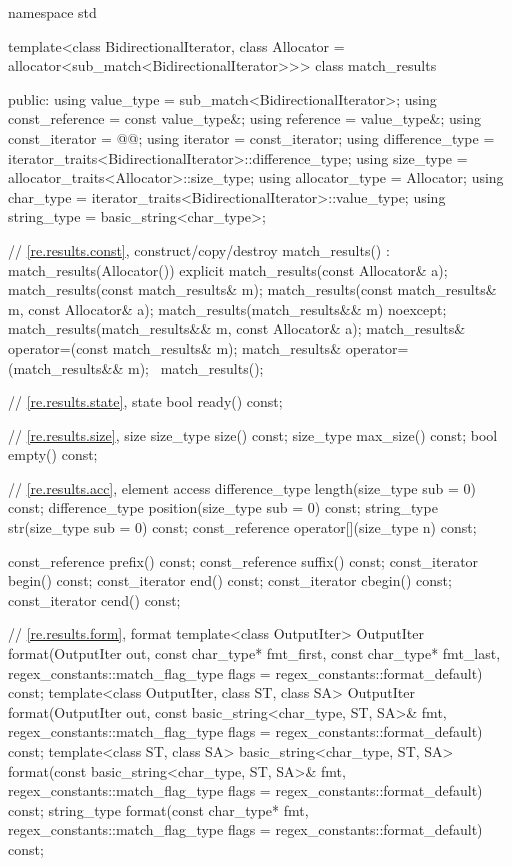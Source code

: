\begin{codeblock}
namespace std {
  template<class BidirectionalIterator,
           class Allocator = allocator<sub_match<BidirectionalIterator>>>
  class match_results {
  public:
    using value_type      = sub_match<BidirectionalIterator>;
    using const_reference = const value_type&;
    using reference       = value_type&;
    using const_iterator  = @@;
    using iterator        = const_iterator;
    using difference_type = iterator_traits<BidirectionalIterator>::difference_type;
    using size_type       = allocator_traits<Allocator>::size_type;
    using allocator_type  = Allocator;
    using char_type       = iterator_traits<BidirectionalIterator>::value_type;
    using string_type     = basic_string<char_type>;

    // \ref{re.results.const}, construct/copy/destroy
    match_results() : match_results(Allocator()) {}
    explicit match_results(const Allocator& a);
    match_results(const match_results& m);
    match_results(const match_results& m, const Allocator& a);
    match_results(match_results&& m) noexcept;
    match_results(match_results&& m, const Allocator& a);
    match_results& operator=(const match_results& m);
    match_results& operator=(match_results&& m);
    ~match_results();

    // \ref{re.results.state}, state
    bool ready() const;

    // \ref{re.results.size}, size
    size_type size() const;
    size_type max_size() const;
    bool empty() const;

    // \ref{re.results.acc}, element access
    difference_type length(size_type sub = 0) const;
    difference_type position(size_type sub = 0) const;
    string_type str(size_type sub = 0) const;
    const_reference operator[](size_type n) const;

    const_reference prefix() const;
    const_reference suffix() const;
    const_iterator begin() const;
    const_iterator end() const;
    const_iterator cbegin() const;
    const_iterator cend() const;

    // \ref{re.results.form}, format
    template<class OutputIter>
      OutputIter
        format(OutputIter out,
               const char_type* fmt_first, const char_type* fmt_last,
               regex_constants::match_flag_type flags = regex_constants::format_default) const;
    template<class OutputIter, class ST, class SA>
      OutputIter
        format(OutputIter out,
               const basic_string<char_type, ST, SA>& fmt,
               regex_constants::match_flag_type flags = regex_constants::format_default) const;
    template<class ST, class SA>
      basic_string<char_type, ST, SA>
        format(const basic_string<char_type, ST, SA>& fmt,
               regex_constants::match_flag_type flags = regex_constants::format_default) const;
    string_type
      format(const char_type* fmt,
             regex_constants::match_flag_type flags = regex_constants::format_default) const;

}}
\end{codeblock}

